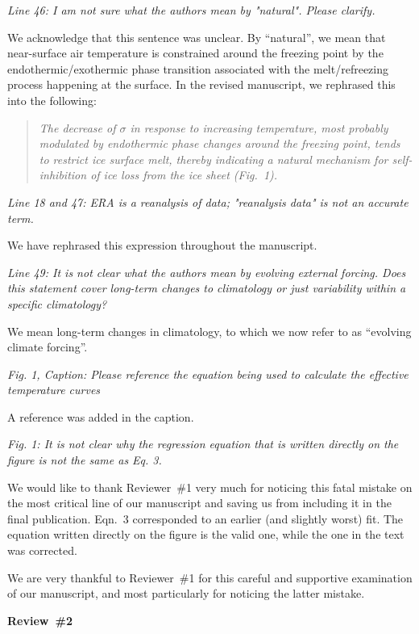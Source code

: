 \documentclass[10pt]{article}
\def\referee#1{\bigskip\textcolor{blue!50!black}{\textit{#1}}}
\def\msquote#1{\begin{quote}\textit{#1}\end{quote}}
\begin{document}
\referee{Line 46: I am not sure what the authors mean by "natural". Please clarify.}

We acknowledge that this sentence was unclear. By ``natural'', we mean that near-surface air temperature is constrained around the freezing point by the endothermic/exothermic phase transition associated with the melt/refreezing process happening at the surface. In the revised manuscript, we rephrased this into the following:

\msquote{The decrease of $\sigma$ in response to increasing temperature, most probably modulated by endothermic phase changes around the freezing point, tends to restrict ice surface melt, thereby indicating a natural mechanism for self-inhibition of ice loss from the ice sheet (Fig.~1).}

\referee{Line 18 and 47: ERA is a reanalysis of data; "reanalysis data" is not an accurate term.}

We have rephrased this expression throughout the manuscript.

\referee{Line 49: It is not clear what the authors mean by evolving external forcing. Does this statement cover long-term changes to climatology or just variability within a specific climatology?}

We mean long-term changes in climatology, to which we now refer to as ``evolving climate forcing''.

\referee{Fig. 1, Caption: Please reference the equation being used to calculate the effective temperature curves}

A reference was added in the caption.

\referee{Fig. 1: It is not clear why the regression equation that is written directly on the figure is not the same as Eq. 3.}

We would like to thank Reviewer~{\#}1 very much for noticing this fatal mistake on the most critical line of our manuscript and saving us from including it in the final publication. Eqn.~3 corresponded to an earlier (and slightly worst) fit. The equation written directly on the figure is the valid one, while the one in the text was corrected.

We are very thankful to Reviewer~{\#}1 for this careful and supportive examination of our manuscript, and most particularly for noticing the latter mistake.


\bigskip
\textbf{Review~{\#}2}
\end{document}
